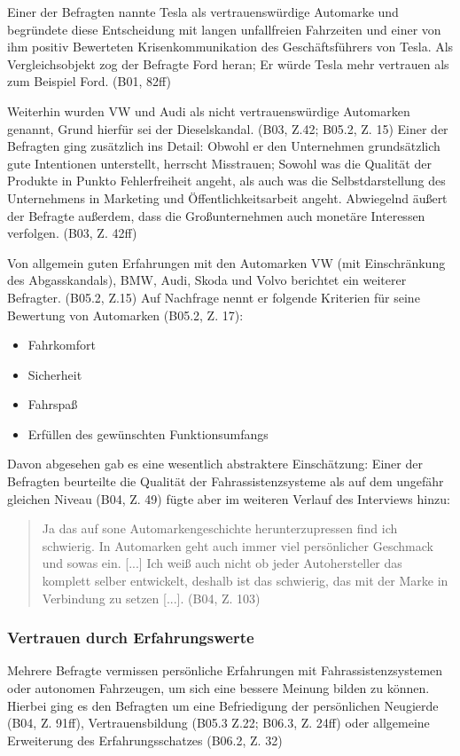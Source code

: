 \documentclass[12pt]{article}
\begin{document}
Einer der Befragten nannte Tesla als vertrauenswürdige Automarke und begründete diese Entscheidung mit langen unfallfreien Fahrzeiten und einer von ihm positiv Bewerteten Krisenkommunikation des Geschäftsführers von Tesla. Als Vergleichsobjekt zog der Befragte Ford heran; Er würde Tesla mehr vertrauen als zum Beispiel Ford. (B01, 82ff)

Weiterhin wurden VW und Audi als nicht vertrauenswürdige Automarken genannt, Grund hierfür sei der Dieselskandal. (B03, Z.42; B05.2, Z. 15) Einer der Befragten ging zusätzlich ins Detail: Obwohl er den Unternehmen grundsätzlich gute Intentionen unterstellt, herrscht Misstrauen; Sowohl was die Qualität der Produkte in Punkto Fehlerfreiheit angeht, als auch was die Selbstdarstellung des Unternehmens in Marketing und Öffentlichkeitsarbeit angeht. Abwiegelnd äußert der Befragte außerdem, dass die Großunternehmen auch monetäre Interessen verfolgen. (B03, Z. 42ff)

Von allgemein guten Erfahrungen mit den Automarken VW (mit Einschränkung des Abgasskandals), BMW, Audi, Skoda und Volvo berichtet ein weiterer Befragter. (B05.2, Z.15) Auf Nachfrage nennt er folgende Kriterien für seine Bewertung von Automarken (B05.2, Z. 17):
\begin{itemize}
  \item Fahrkomfort
  \item Sicherheit
  \item Fahrspaß
  \item Erfüllen des gewünschten Funktionsumfangs
\end{itemize}

Davon abgesehen gab es eine wesentlich abstraktere Einschätzung: Einer der Befragten beurteilte die Qualität der Fahrassistenzsysteme als \glqq auf dem ungefähr gleichen Niveau\grqq{} (B04, Z. 49) fügte aber im weiteren Verlauf des Interviews hinzu:

\begin{quote}
  Ja das auf sone Automarkengeschichte herunterzupressen find ich schwierig. In Automarken geht auch immer viel persönlicher Geschmack und sowas ein. [...] Ich weiß auch nicht ob jeder Autohersteller das komplett selber entwickelt, deshalb ist das schwierig, das mit der Marke in Verbindung zu setzen [...]. (B04, Z. 103)
\end{quote}

\subsubsection*{Vertrauen durch Erfahrungswerte}
Mehrere Befragte vermissen persönliche Erfahrungen mit Fahrassistenzsystemen oder autonomen Fahrzeugen, um sich eine bessere Meinung bilden zu können. Hierbei ging es den Befragten um eine Befriedigung der persönlichen Neugierde (B04, Z. 91ff), Vertrauensbildung (B05.3 Z.22; B06.3, Z. 24ff) oder allgemeine Erweiterung des Erfahrungsschatzes (B06.2, Z. 32)
\end{document}
